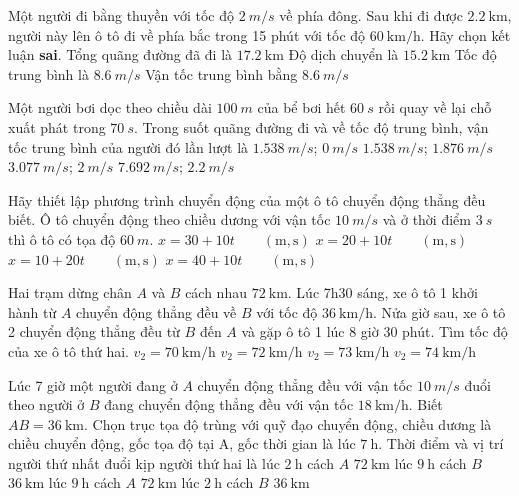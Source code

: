 \begin{ex}
Một người đi bằng thuyền với tốc độ $\SI{2}{m/s}$ về phía đông. Sau khi đi được $\SI{2.2}{\kilo\meter}$, người này lên ô tô đi về phía bắc trong 15 phút với tốc độ $\SI{60}{\kilo\meter/\hour}$. Hãy chọn kết luận \textbf{sai}.
		\choice
		{Tổng quãng đường đã đi là $\SI{17.2}{\kilo\meter}$}
		{Độ dịch chuyển là $\SI{15.2}{\kilo\meter}$}
		{Tốc độ trung bình là $\SI{8.6}{m/s}$}
		{\True Vận tốc trung bình bằng $\SI{8.6}{m/s}$}
	\loigiai{}
\end{ex}

\begin{ex}
Một người bơi dọc theo chiều dài $\SI{100}{m}$ của bể bơi hết $\SI{60}{s}$ rồi quay về lại chỗ xuất phát trong $\SI{70}{s}$. Trong suốt quãng đường đi và về tốc độ trung bình, vận tốc trung bình của người đó lần lượt là
		\choice
		{\True $\SI{1.538}{m/s}$; $\SI{0}{m/s}$}
		{$\SI{1.538}{m/s}$; $\SI{1.876}{m/s}$}
		{$\SI{3.077}{m/s}$; $\SI{2}{m/s}$}
		{$\SI{7.692}{m/s}$; $\SI{2.2}{m/s}$}
	\loigiai{}
\end{ex}

\begin{ex}
Hãy thiết lập phương trình chuyển động của một ô tô chuyển động thẳng đều biết. Ô tô chuyển động theo chiều dương với vận tốc $\SI{10}{m/s}$ và ở thời điểm $\SI{3}{s}$ thì ô tô có tọa độ $\SI{60}{m}$.
		\choice
		{\True $x=30+10t\qquad\left(\si{\meter}, \si{\second}\right)$}
		{$x=20+10t\qquad\left(\si{\meter}, \si{\second}\right)$}
		{$x=10+20t\qquad\left(\si{\meter}, \si{\second}\right)$}
		{$x=40+10t\qquad\left(\si{\meter}, \si{\second}\right)$}
	\loigiai{}
\end{ex}

\begin{ex}
	Hai trạm dừng chân $A$ và $B$ cách nhau $\SI{72}{\kilo\meter}$. Lúc 7h30 sáng, xe ô tô 1 khởi hành từ $A$ chuyển động thẳng đều về $B$ với tốc độ $\SI{36}{\kilo\meter/\hour}$. Nửa giờ sau, xe ô tô 2 chuyển động thẳng đều từ $B$ đến $A$ và gặp ô tô 1 lúc 8 giờ 30 phút. Tìm tốc độ của xe ô tô thứ hai.
		\choice
		{$v_2=\SI{70}{\kilo\meter/\hour}$}
		{\True $v_2=\SI{72}{\kilo\meter/\hour}$}
		{$v_2=\SI{73}{\kilo\meter/\hour}$}
		{$v_2=\SI{74}{\kilo\meter/\hour}$}
	
	\loigiai{}
\end{ex}

\begin{ex}
	Lúc 7 giờ một người đang ở $A$ chuyển động thẳng đều với vận tốc $\SI{10}{m/s}$ đuổi theo người ở $B$ đang chuyển động thẳng đều với vận tốc $\SI{18}{\kilo\meter/\hour}$. Biết $AB =\SI{36}{\kilo\meter}$. Chọn trục tọa độ trùng với quỹ đạo chuyển động, chiều dương là chiều chuyển động, gốc tọa độ tại A, gốc thời gian là lúc $\SI{7}{\hour}$. Thời điểm và vị trí người thứ nhất đuổi kịp người thứ hai là
		\choice
		{lúc $\SI{2}{\hour}$ cách $A$ $\SI{72}{\kilo\meter}$}
		{lúc $\SI{9}{\hour}$ cách $B$ $\SI{36}{\kilo\meter}$}
		{\True lúc $\SI{9}{\hour}$ cách $A$ $\SI{72}{\kilo\meter}$}
		{lúc $\SI{2}{\hour}$ cách $B$ $\SI{36}{\kilo\meter}$}
	\loigiai{}
\end{ex}

